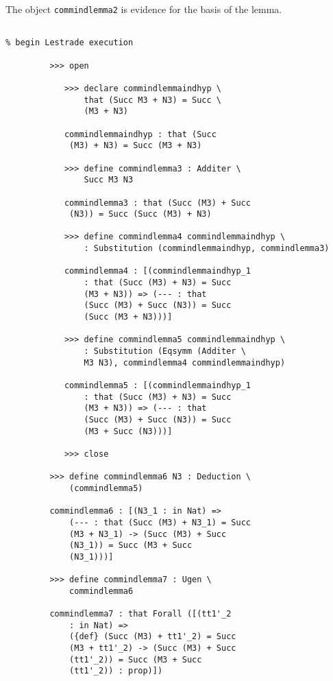 \documentclass[12pt]{article}
\begin{document}
The object {\tt commindlemma2} is evidence for the basis of the lemma.

\begin{verbatim}

% begin Lestrade execution

         >>> open

            >>> declare commindlemmaindhyp \
                that (Succ M3 + N3) = Succ \
                (M3 + N3)

            commindlemmaindhyp : that (Succ 
             (M3) + N3) = Succ (M3 + N3)

            >>> define commindlemma3 : Additer \
                Succ M3 N3

            commindlemma3 : that (Succ (M3) + Succ 
             (N3)) = Succ (Succ (M3) + N3)

            >>> define commindlemma4 commindlemmaindhyp \
                : Substitution (commindlemmaindhyp, commindlemma3)

            commindlemma4 : [(commindlemmaindhyp_1 
                : that (Succ (M3) + N3) = Succ 
                (M3 + N3)) => (--- : that 
                (Succ (M3) + Succ (N3)) = Succ 
                (Succ (M3 + N3)))]

            >>> define commindlemma5 commindlemmaindhyp \
                : Substitution (Eqsymm (Additer \
                M3 N3), commindlemma4 commindlemmaindhyp)

            commindlemma5 : [(commindlemmaindhyp_1 
                : that (Succ (M3) + N3) = Succ 
                (M3 + N3)) => (--- : that 
                (Succ (M3) + Succ (N3)) = Succ 
                (M3 + Succ (N3)))]

            >>> close

         >>> define commindlemma6 N3 : Deduction \
             (commindlemma5)

         commindlemma6 : [(N3_1 : in Nat) => 
             (--- : that (Succ (M3) + N3_1) = Succ 
             (M3 + N3_1) -> (Succ (M3) + Succ 
             (N3_1)) = Succ (M3 + Succ 
             (N3_1)))]

         >>> define commindlemma7 : Ugen \
             commindlemma6

         commindlemma7 : that Forall ([(tt1'_2 
             : in Nat) => 
             ({def} (Succ (M3) + tt1'_2) = Succ 
             (M3 + tt1'_2) -> (Succ (M3) + Succ 
             (tt1'_2)) = Succ (M3 + Succ 
             (tt1'_2)) : prop)])


\end{verbatim}
\end{document}
